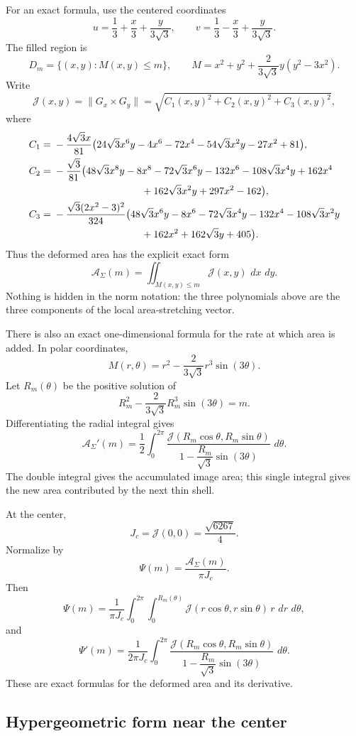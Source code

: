\documentclass[11pt]{article}
\newcommand{\dd}{\,d}
\begin{document}
For an exact formula, use the centered coordinates
\[
u=\frac13+\frac{x}{3}+\frac{y}{3\sqrt3},
\qquad
v=\frac13-\frac{x}{3}+\frac{y}{3\sqrt3}.
\]
The filled region is
\[
D_m=\{(x,y):M(x,y)\le m\},
\qquad
M=x^2+y^2+\frac{2}{3\sqrt3}y(y^2-3x^2).
\]
Write
\[
\mathcal J(x,y)=\|G_x\times G_y\|
=\sqrt{C_1(x,y)^2+C_2(x,y)^2+C_3(x,y)^2},
\]
where
\begin{align*}
C_1={}&-\frac{4\sqrt3x}{81}
\bigl(24\sqrt3x^6y-4x^6-72x^4-54\sqrt3x^2y-27x^2+81\bigr),\\
C_2={}&-\frac{\sqrt3}{81}
\bigl(48\sqrt3x^8y-8x^8-72\sqrt3x^6y-132x^6
-108\sqrt3x^4y+162x^4\\
&\hspace{3.1cm}+162\sqrt3x^2y+297x^2-162\bigr),\\
C_3={}&-\frac{\sqrt3(2x^2-3)^2}{324}
\bigl(48\sqrt3x^6y-8x^6-72\sqrt3x^4y-132x^4
-108\sqrt3x^2y\\
&\hspace{3.1cm}+162x^2+162\sqrt3y+405\bigr).
\end{align*}
Thus the deformed area has the explicit exact form
\[
\boxed{
\mathcal A_\Sigma(m)=
\iint_{M(x,y)\le m}\mathcal J(x,y)\,\dd x\,\dd y.}
\]
Nothing is hidden in the norm notation: the three polynomials above are the
three components of the local area-stretching vector.

There is also an exact one-dimensional formula for the rate at which area is
added. In polar coordinates,
\[
M(r,\theta)=r^2-\frac{2}{3\sqrt3}r^3\sin(3\theta).
\]
Let $R_m(\theta)$ be the positive solution of
\[
R_m^2-\frac{2}{3\sqrt3}R_m^3\sin(3\theta)=m.
\]
Differentiating the radial integral gives
\[
\boxed{
\mathcal A_\Sigma'(m)=\frac12\int_0^{2\pi}
\frac{\mathcal J(R_m\cos\theta,R_m\sin\theta)}
{1-\dfrac{R_m}{\sqrt3}\sin(3\theta)}\,\dd\theta.}
\]
The double integral gives the accumulated image area; this single integral
gives the new area contributed by the next thin shell.

At the center,
\[
J_c=\mathcal J(0,0)=\frac{\sqrt{6267}}4.
\]
Normalize by
\[
\Psi(m)=\frac{\mathcal A_\Sigma(m)}{\pi J_c}.
\]
Then
\[
\Psi(m)=\frac{1}{\pi J_c}\int_0^{2\pi}
\int_0^{R_m(\theta)}\mathcal J(r\cos\theta,r\sin\theta)
\,r\,\dd r\,\dd\theta,
\]
and
\[
\Psi'(m)=\frac{1}{2\pi J_c}\int_0^{2\pi}
\frac{\mathcal J(R_m\cos\theta,R_m\sin\theta)}
{1-\dfrac{R_m}{\sqrt3}\sin(3\theta)}\,\dd\theta.
\]
These are exact formulas for the deformed area and its derivative.

\subsection*{Hypergeometric form near the center}
\end{document}

